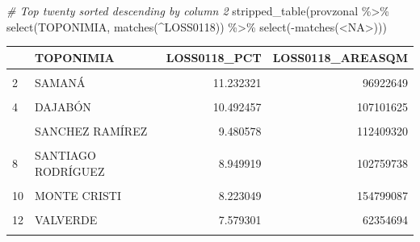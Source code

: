 \documentclass[10pt,landscape,a3paper]{article}
\newenvironment{Shaded}{\begin{snugshade}}{\end{snugshade}}
\newcommand{\CommentTok}[1]{\textcolor[rgb]{0.56,0.35,0.01}{\textit{#1}}}
\newcommand{\FunctionTok}[1]{\textcolor[rgb]{0.00,0.00,0.00}{#1}}
\newcommand{\NormalTok}[1]{#1}
\newcommand{\SpecialCharTok}[1]{\textcolor[rgb]{0.00,0.00,0.00}{#1}}
\newcommand{\StringTok}[1]{\textcolor[rgb]{0.31,0.60,0.02}{#1}}
\begin{document}
\begin{Shaded}
\begin{Highlighting}[]
\CommentTok{\# Top twenty sorted descending by column 2}
\FunctionTok{stripped\_table}\NormalTok{(provzonal }\SpecialCharTok{\%\textgreater{}\%} \FunctionTok{select}\NormalTok{(TOPONIMIA, }\FunctionTok{matches}\NormalTok{(}\StringTok{\textquotesingle{}\^{}LOSS0118\textquotesingle{}}\NormalTok{)) }\SpecialCharTok{\%\textgreater{}\%} \FunctionTok{select}\NormalTok{(}\SpecialCharTok{{-}}\FunctionTok{matches}\NormalTok{(}\StringTok{\textquotesingle{}\textless{}NA\textgreater{}\textquotesingle{}}\NormalTok{)))}
\end{Highlighting}
\end{Shaded}

\begin{table}[H]
\centering
\begin{tabular}[t]{llrr}
\toprule
  & TOPONIMIA & LOSS0118\_PCT & LOSS0118\_AREASQM\\
\midrule
\cellcolor{lightgray}{1} & \cellcolor{lightgray}{MONTE PLATA} & \cellcolor{lightgray}{11.622916} & \cellcolor{lightgray}{302473946}\\
2 & SAMANÁ & 11.232321 & 96922649\\
\cellcolor{lightgray}{3} & \cellcolor{lightgray}{HATO MAYOR} & \cellcolor{lightgray}{10.635182} & \cellcolor{lightgray}{140126481}\\
4 & DAJABÓN & 10.492457 & 107101625\\
\cellcolor{lightgray}{5} & \cellcolor{lightgray}{PUERTO PLATA} & \cellcolor{lightgray}{9.540494} & \cellcolor{lightgray}{172314432}\\
\addlinespace
6 & SANCHEZ RAMÍREZ & 9.480578 & 112409320\\
\cellcolor{lightgray}{7} & \cellcolor{lightgray}{BARAHONA} & \cellcolor{lightgray}{9.181408} & \cellcolor{lightgray}{152451002}\\
8 & SANTIAGO RODRÍGUEZ & 8.949919 & 102759738\\
\cellcolor{lightgray}{9} & \cellcolor{lightgray}{LA ALTAGRACIA} & \cellcolor{lightgray}{8.320683} & \cellcolor{lightgray}{249292186}\\
10 & MONTE CRISTI & 8.223049 & 154799087\\
\addlinespace
\cellcolor{lightgray}{11} & \cellcolor{lightgray}{PEDERNALES} & \cellcolor{lightgray}{7.825075} & \cellcolor{lightgray}{162766292}\\
12 & VALVERDE & 7.579301 & 62354694\\
\cellcolor{lightgray}{13} & \cellcolor{lightgray}{ELÍAS PIÑA} & \cellcolor{lightgray}{6.865931} & \cellcolor{lightgray}{95820932}\\

\end{tabular}
\end{table}
\end{document}
